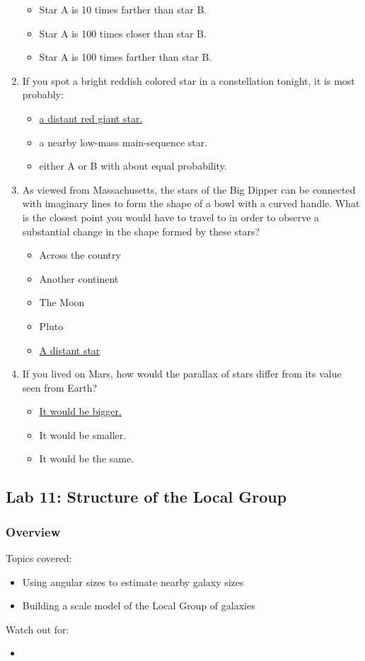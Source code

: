 \documentclass[12pt]{article}
\begin{document}
\begin{enumerate}
\begin{itemize}
    \item Star A is 10 times farther than star B.
    \item Star A is 100 times closer than star B.
    \item Star A is 100 times farther than star B.
\end{itemize}
\item
If you spot a bright reddish colored star in a constellation tonight, it is most probably:
\begin{itemize}
    \item \underline{a distant red giant star.}
    \item a nearby low-mass main-sequence star.
    \item either A or B with about equal probability.
\end{itemize}
\item
As viewed from Massachusetts, the stars of the Big Dipper can be connected with imaginary lines to form the shape of a bowl with a curved handle. What is the closest point you would have to travel to in order to observe a substantial change in the shape formed by these stars?
\begin{itemize}
    \item Across the country
    \item Another continent
    \item The Moon
    \item Pluto
    \item \underline{A distant star}
\end{itemize}
\item
If you lived on Mars, how would the parallax of stars differ from its value seen from Earth?
\begin{itemize}
    \item \underline{It would be bigger.}
    \item It would be smaller.
    \item It would be the same.
\end{itemize}
\end{enumerate}

\newpage
\subsection{Lab 11: Structure of the Local Group}
\subsubsection{Overview}
Topics covered:
\begin{itemize}
\item Using angular sizes to estimate nearby galaxy sizes
\item Building a scale model of the Local Group of galaxies
\end{itemize}
Watch out for:
\begin{itemize}
\item 
\end{itemize}
\end{document}
